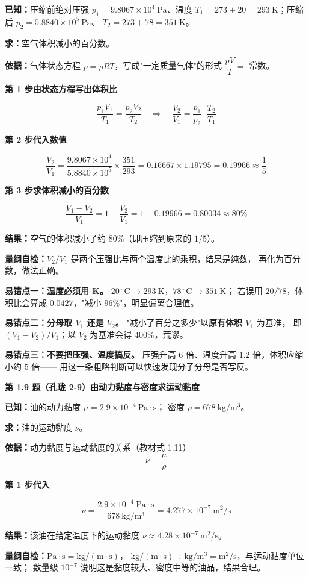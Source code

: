\begin{jie}
\textbf{已知：}压缩前绝对压强 $p_1=9.8067\times10^{4}\ \mathrm{Pa}$、温度
$T_1=273+20=293\ \mathrm{K}$；压缩后 $p_2=5.8840\times10^{5}\ \mathrm{Pa}$、
$T_2=273+78=351\ \mathrm{K}$。

\textbf{求：}空气体积减小的百分数。

\textbf{依据：}气体状态方程 $p=\rho RT$，写成"一定质量气体"的形式
$\dfrac{pV}{T}=$ 常数。

\textbf{第 1 步\quad 由状态方程写出体积比}

\[ \frac{p_1V_1}{T_1}=\frac{p_2V_2}{T_2}
   \quad\Longrightarrow\quad
   \frac{V_2}{V_1}=\frac{p_1}{p_2}\cdot\frac{T_2}{T_1} \]

\textbf{第 2 步\quad 代入数值}

\[ \frac{V_2}{V_1}=\frac{9.8067\times10^{4}}{5.8840\times10^{5}}\times\frac{351}{293}
   =0.16667\times1.19795=0.19966\approx\frac{1}{5} \]

\textbf{第 3 步\quad 求体积减小的百分数}

\[ \frac{V_1-V_2}{V_1}=1-\frac{V_2}{V_1}=1-0.19966=0.80034\approx80\% \]

\textbf{结果：}空气的体积减小了约 $80\%$（即压缩到原来的 $1/5$）。

\textbf{量纲自检：}$V_2/V_1$ 是两个压强比与两个温度比的乘积，结果是纯数，
再化为百分数，做法正确。
\end{jie}

\begin{yicuo}
\textbf{易错点一：温度必须用 K。}
$20\ ^{\circ}\mathrm{C}\to293\ \mathrm{K}$，$78\ ^{\circ}\mathrm{C}\to351\ \mathrm{K}$；
若误用 $20/78$，体积比会算成 $0.0427$，"减小 $96\%$"，明显偏离合理值。

\textbf{易错点二：分母取 $V_1$ 还是 $V_2$。}
"减小了百分之多少"以\textbf{原有体积 $V_1$} 为基准，
即 $(V_1-V_2)/V_1$；以 $V_2$ 为基准会得 $400\%$，荒谬。

\textbf{易错点三：不要把压强、温度搞反。}
压强升高 $6$ 倍、温度升高 $1.2$ 倍，体积应缩小约 $5$ 倍——
用这一条粗略判断可以快速发现分子分母是否写反。
\end{yicuo}

\noindent\textbf{第 1.9 题（孔珑 2-9）\quad 由动力黏度与密度求运动黏度}

\begin{jie}
\textbf{已知：}油的动力黏度 $\mu=2.9\times10^{-4}\ \mathrm{Pa\cdot s}$；
密度 $\rho=678\ \mathrm{kg/m^3}$。

\textbf{求：}油的运动黏度 $\nu$。

\textbf{依据：}动力黏度与运动黏度的关系（教材式 1.11）
\[ \nu=\frac{\mu}{\rho} \]

\textbf{第 1 步\quad 代入}

\[ \nu=\frac{2.9\times10^{-4}\ \mathrm{Pa\cdot s}}{678\ \mathrm{kg/m^3}}
     =4.277\times10^{-7}\ \mathrm{m^2/s} \]

\textbf{结果：}该油在给定温度下的运动黏度 $\nu\approx4.28\times10^{-7}\ \mathrm{m^2/s}$。

\textbf{量纲自检：}$\mathrm{Pa\cdot s}=\mathrm{kg/(m\cdot s)}$，
$\mathrm{kg/(m\cdot s)}\div\mathrm{kg/m^3}=\mathrm{m^2/s}$，与运动黏度单位一致；
数量级 $10^{-7}$ 说明这是黏度较大、密度中等的油品，结果合理。
\end{jie}

